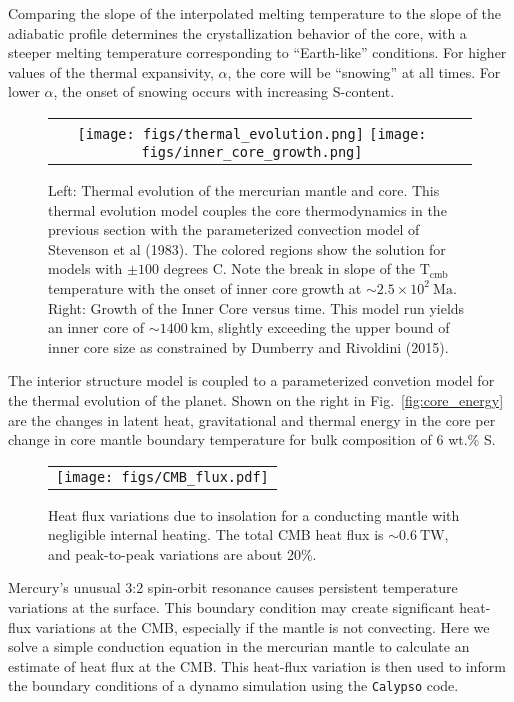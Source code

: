 Comparing the slope of the interpolated melting temperature to the slope of the
adiabatic profile determines the crystallization behavior of the core, with a
steeper melting temperature corresponding to  ``Earth-like'' conditions. For higher
values of the thermal expansivity, $\alpha$, the core will be ``snowing'' at all
times. For lower $\alpha$, the onset of snowing occurs with increasing S-content.


 \begin{figure}[H] %
   \centering
\begin{tabular}{cc}
 \texttt{[image: figs/thermal\_evolution.png]}
 \texttt{[image: figs/inner\_core\_growth.png]}
\end{tabular}
\caption{Left: Thermal evolution of the mercurian mantle and core. This
  thermal evolution model couples the core thermodynamics in the previous section
  with the parameterized convection model of Stevenson et al (1983). The colored
  regions show the solution for models with $\pm \mathrm{100}$ degrees C. Note the
  break in slope of the $\mathrm{T_{cmb}}$ temperature with the onset of inner core
  growth at $\sim 2.5\times10^2~\mathrm{Ma}$. Right: Growth of the Inner Core versus
  time. This model run yields an inner core of $ \sim 1400~\mathrm{km}$, slightly
exceeding the upper bound of inner core size as constrained by Dumberry and Rivoldini
(2015).}
  \label{fig:thermal}
\end{figure}

The interior structure model is coupled to a parameterized convetion model for
the thermal evolution of the planet. Shown on the right in Fig.~\ref{fig:core_energy}
are the changes in latent heat, gravitational and thermal energy in the core per
change in core mantle boundary temperature for bulk composition of 6 wt.\% S. 



 \begin{figure}[H] %
   \centering
\begin{tabular}{c}
 \texttt{[image: figs/CMB\_flux.pdf]} 
\end{tabular}
\caption{ Heat flux variations due to insolation for a conducting mantle with negligible internal heating. The total CMB heat flux is $\sim 0.6~\mathrm{TW}$, and peak-to-peak variations are about 20\%. }
\label{fig:flux}
\end{figure}

Mercury's unusual 3:2 spin-orbit resonance causes persistent temperature variations at the surface.  This boundary condition may create significant heat-flux variations at the CMB, especially if the mantle is not convecting.  Here we solve a simple conduction equation in the mercurian mantle to calculate an estimate of heat flux at the CMB.  This heat-flux variation is then used to inform the boundary conditions of a dynamo simulation using the \texttt{Calypso} code.

